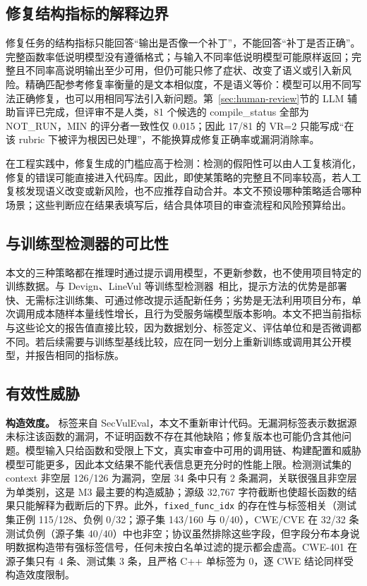 \documentclass[conference]{IEEEtran}
\begin{document}
\subsection{修复结构指标的解释边界}
修复任务的结构指标只能回答“输出是否像一个补丁”，不能回答“补丁是否正确”。完整函数率低说明模型没有遵循格式；与输入不同率低说明模型可能原样返回；完整且不同率高说明输出至少可用，但仍可能只修了症状、改变了语义或引入新风险。精确匹配参考修复率衡量的是文本相似度，不是语义等价：模型可以用不同写法正确修复，也可以用相同写法引入新问题。第~\ref{sec:human-review}节的 LLM 辅助盲评已完成，但评审不是人类，81 个候选的 compile\_status 全部为 NOT\_RUN，MIN 的评分者一致性仅 0.015；因此 17/81 的 VR=2 只能写成“在该 rubric 下被评为根因已处理”，不能换算成修复正确率或漏洞消除率。

在工程实践中，修复生成的门槛应高于检测：检测的假阳性可以由人工复核消化，修复的错误可能直接进入代码库。因此，即使某策略的完整且不同率较高，若人工复核发现语义改变或新风险，也不应推荐自动合并。本文不预设哪种策略适合哪种场景；这些判断应在结果表填写后，结合具体项目的审查流程和风险预算给出。

\subsection{与训练型检测器的可比性}
本文的三种策略都在推理时通过提示调用模型，不更新参数，也不使用项目特定的训练数据。与 Devign、LineVul 等训练型检测器~\cite{zhou2019devign,fu2022linevul}相比，提示方法的优势是部署快、无需标注训练集、可通过修改提示适配新任务；劣势是无法利用项目分布，单次调用成本随样本量线性增长，且行为受服务端模型版本影响。本文不把当前指标与这些论文的报告值直接比较，因为数据划分、标签定义、评估单位和是否微调都不同。若后续需要与训练型基线比较，应在同一划分上重新训练或调用其公开模型，并报告相同的指标族。

\subsection{有效性威胁}
\textbf{构造效度。} 标签来自 SecVulEval，本文不重新审计代码。无漏洞标签表示数据源未标注该函数的漏洞，不证明函数不存在其他缺陷；修复版本也可能仍含其他问题。模型输入只给函数和受限上下文，真实审查中可用的调用链、构建配置和威胁模型可能更多，因此本文结果不能代表信息更充分时的性能上限。检测测试集的 context 非空层 126/126 为漏洞，空层 34 条中只有 2 条漏洞，关联很强且非空层为单类别，这是 M3 最主要的构造威胁；源级 32{,}767 字符截断也使超长函数的结果只能解释为截断后的下界。此外，\texttt{fixed\_func\_idx} 的存在性与标签相关（测试集正例 115/128、负例 0/32；源子集 143/160 与 0/40），CWE/CVE 在 32/32 条测试负例（源子集 40/40）中也非空；协议虽然排除这些字段，但字段分布本身说明数据构造带有强标签信号，任何未按白名单过滤的提示都会虚高。CWE-401 在源子集只有 4 条、测试集 3 条，且严格 C++ 单标签为 0，逐 CWE 结论同样受构造效度限制。
\end{document}
